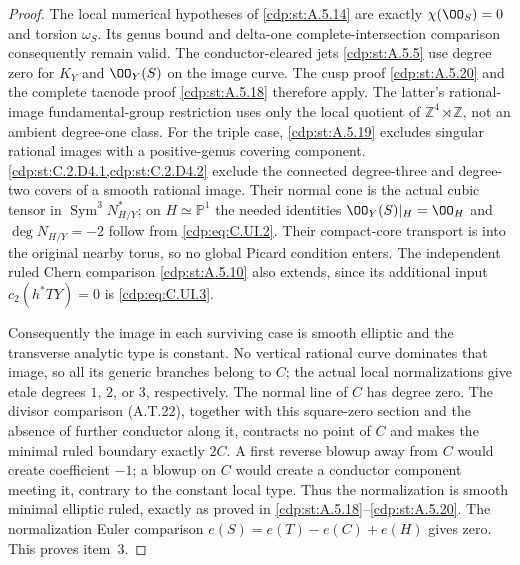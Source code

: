 \begin{proof}
The local numerical hypotheses of \ref{cdp:st:A.5.14} are
exactly $\chi(\OO_S)=0$ and torsion $\omega_S$.
Its genus bound and delta-one complete-intersection
comparison consequently remain valid. The
conductor-cleared jets \ref{cdp:st:A.5.5} use degree zero for
$K_Y$ and $\OO_Y(S)$ on the image curve.
The cusp proof \ref{cdp:st:A.5.20} and the complete tacnode
proof \ref{cdp:st:A.5.18} therefore apply. The latter's
rational-image fundamental-group restriction
uses only the local quotient of
$\mathbb Z^4\rtimes\mathbb Z$, not an ambient
degree-one class. For the triple case, \ref{cdp:st:A.5.19}
excludes singular rational images with a
positive-genus covering component. \cref{cdp:st:C.2.D4.1,cdp:st:C.2.D4.2}
exclude the connected degree-three and degree-two
covers of a smooth rational image. Their normal
cone is the actual cubic tensor in
$\operatorname{Sym}^3N_{H/Y}^*$; on
$H\simeq\mathbb P^1$ the needed identities
$\OO_Y(S)|_H=\OO_H$ and $\deg N_{H/Y}=-2$
follow from \eqref{cdp:eq:C.UI.2}. Their compact-core
transport is into the original nearby torus,
so no global Picard condition enters. The
independent ruled Chern comparison \ref{cdp:st:A.5.10} also
extends, since its additional input
$c_2(h^*TY)=0$ is \eqref{cdp:eq:C.UI.3}.

Consequently the image in each surviving case
is smooth elliptic and the transverse analytic
type is constant. No vertical rational curve
dominates that image, so all its generic
branches belong to $C$; the actual local
normalizations give etale degrees $1$, $2$,
or $3$, respectively. The normal line of $C$
has degree zero. The divisor comparison
(A.T.22), together with this square-zero
section and the absence of further conductor
along it, contracts no point of $C$ and makes
the minimal ruled boundary exactly $2C$.
A first reverse blowup away from $C$ would
create coefficient $-1$; a blowup on $C$
would create a conductor component meeting
it, contrary to the constant local type.
Thus the normalization is smooth minimal
elliptic ruled, exactly as proved in
\ref{cdp:st:A.5.18}--\ref{cdp:st:A.5.20}. The normalization Euler
comparison $e(S)=e(T)-e(C)+e(H)$ gives zero.
This proves item~3.


\end{proof}
